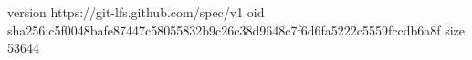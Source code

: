 version https://git-lfs.github.com/spec/v1
oid sha256:c5f0048bafe87447c58055832b9c26c38d9648c7f6d6fa5222c5559fccdb6a8f
size 53644
